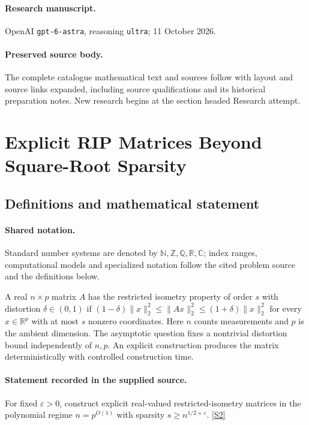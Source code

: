 \documentclass[11pt]{article}
\begin{document}
\paragraph{Research manuscript.} OpenAI \texttt{gpt-6-astra}, reasoning \texttt{ultra}; 11 October 2026.
\paragraph{Preserved source body.} The complete catalogue mathematical text and sources follow with layout and source links expanded, including source qualifications and its historical preparation notes. New research begins at the section headed Research attempt.

\section{Explicit RIP Matrices Beyond Square-Root Sparsity}\label{statement}

\subsection{Definitions and mathematical statement}

\paragraph{Shared notation.}Standard number systems are denoted by $\mathbb N,\mathbb Z,\mathbb Q,\mathbb R,\mathbb C$; index ranges, computational models and specialized notation follow the cited problem source and the definitions below.


A real $n\times p$ matrix $A$ has the restricted isometry property of order $s$ with distortion $\delta\in(0,1)$ if $(1-\delta)\|x\|_2^2\leq\|Ax\|_2^2\leq(1+\delta)\|x\|_2^2$ for every $x\in\mathbb R^p$ with at most $s$ nonzero coordinates. Here $n$ counts measurements and $p$ is the ambient dimension. The asymptotic question fixes a nontrivial distortion bound independently of $n,p$. An explicit construction produces the matrix deterministically with controlled construction time.
\paragraph{Statement recorded in the supplied source.}
For fixed $\varepsilon>0$, construct explicit real-valued restricted-isometry matrices in the polynomial regime $n=p^{O(1)}$ with sparsity $s\geq n^{1/2+\varepsilon}$. \href{https://doi.org/10.4171/owr/2019/19}{[S2]}
\end{document}
